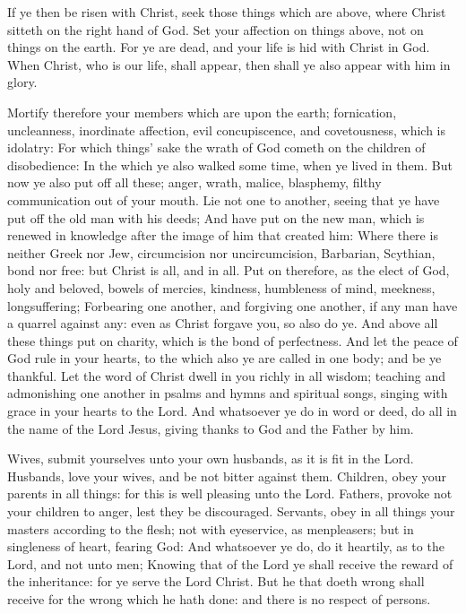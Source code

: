  If ye then be risen with Christ, seek those things which
are above, where Christ sitteth on the right hand of God. 
Set your affection on things above, not on things on the earth.
 For ye are dead, and your life is hid with Christ in God.
 When Christ, who is our life, shall appear, then shall ye
also appear with him in glory.

 Mortify therefore your members which are upon the earth;
fornication, uncleanness, inordinate affection, evil concupiscence, and
covetousness, which is idolatry:  For which things' sake
the wrath of God cometh on the children of disobedience: 
In the which ye also walked some time, when ye lived in them.
 But now ye also put off all these; anger, wrath, malice,
blasphemy, filthy communication out of your mouth.  Lie
not one to another, seeing that ye have put off the old man with his
deeds;  And have put on the new man, which is renewed in
knowledge after the image of him that created him:  Where
there is neither Greek nor Jew, circumcision nor uncircumcision,
Barbarian, Scythian, bond nor free: but Christ is all, and in all.
 Put on therefore, as the elect of God, holy and beloved,
bowels of mercies, kindness, humbleness of mind, meekness,
longsuffering;  Forbearing one another, and forgiving one
another, if any man have a quarrel against any: even as Christ forgave
you, so also do ye.  And above all these things put on
charity, which is the bond of perfectness.  And let the
peace of God rule in your hearts, to the which also ye are called in one
body; and be ye thankful.  Let the word of Christ dwell
in you richly in all wisdom; teaching and admonishing one another in
psalms and hymns and spiritual songs, singing with grace in your hearts
to the Lord.  And whatsoever ye do in word or deed, do
all in the name of the Lord Jesus, giving thanks to God and the Father
by him.

 Wives, submit yourselves unto your own husbands, as it
is fit in the Lord.  Husbands, love your wives, and be
not bitter against them.  Children, obey your parents in
all things: for this is well pleasing unto the Lord. 
Fathers, provoke not your children to anger, lest they be discouraged.
 Servants, obey in all things your masters according to
the flesh; not with eyeservice, as menpleasers; but in singleness of
heart, fearing God:  And whatsoever ye do, do it
heartily, as to the Lord, and not unto men;  Knowing that
of the Lord ye shall receive the reward of the inheritance: for ye serve
the Lord Christ.  But he that doeth wrong shall receive
for the wrong which he hath done: and there is no respect of persons.

